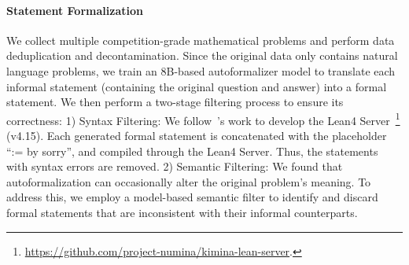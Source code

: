 \noindent\paragraph{Statement Formalization}
We collect multiple competition-grade mathematical problems 
and perform data deduplication and decontamination.
Since the original data only contains natural language problems, we train an 8B-based autoformalizer model to translate each informal statement (containing the original question and answer) into a formal statement.
We then perform a two-stage filtering process to ensure its correctness:
1) Syntax Filtering: We follow~\citet{wang2025kimina}'s work to develop the Lean4 Server~\footnote{\url{https://github.com/project-numina/kimina-lean-server}.} (v4.15). Each generated formal statement is concatenated with the placeholder ``:= by sorry'', and compiled through the Lean4 Server. Thus, the statements with syntax errors are removed.
2) Semantic Filtering: We found that autoformalization can occasionally alter the original problem's meaning.
To address this, we employ a model-based semantic filter to identify and discard formal statements that are inconsistent with their informal counterparts.





